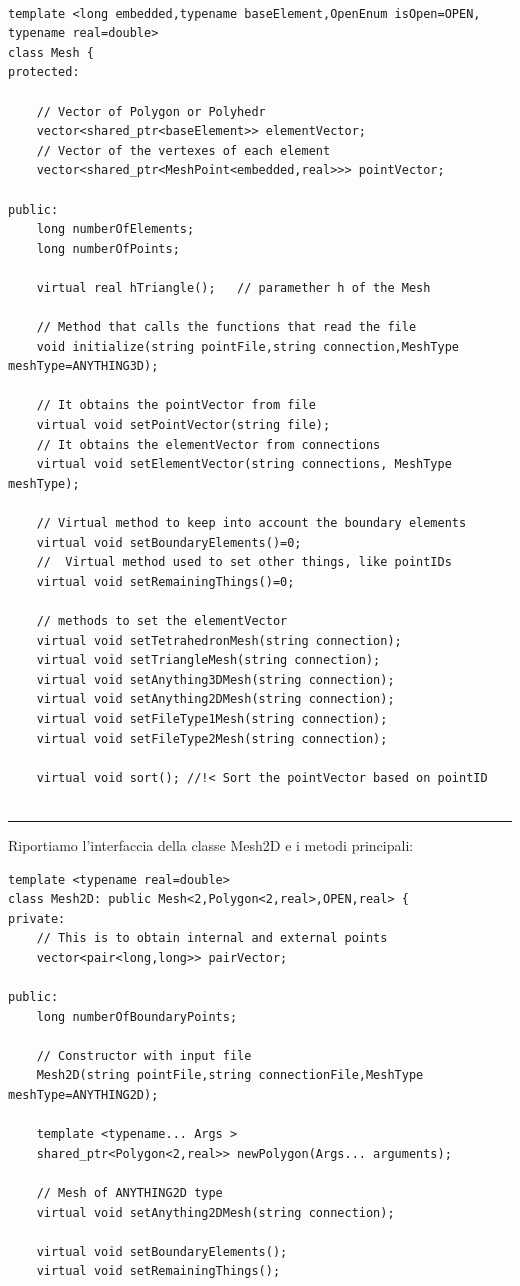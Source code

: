 \documentclass[oneside,12pt]{book}  %
\theoremstyle{plain}
\theoremstyle{definition}
\theoremstyle{remark}
\numberwithin{equation}{chapter} %
\begin{document}
\begin{verbatim}

template <long embedded,typename baseElement,OpenEnum isOpen=OPEN,
typename real=double>
class Mesh {
protected:
    
    // Vector of Polygon or Polyhedr
    vector<shared_ptr<baseElement>> elementVector;	
    // Vector of the vertexes of each element
    vector<shared_ptr<MeshPoint<embedded,real>>> pointVector;	
	
public:
    long numberOfElements;
    long numberOfPoints;

    virtual real hTriangle();	// paramether h of the Mesh
	
    // Method that calls the functions that read the file
    void initialize(string pointFile,string connection,MeshType meshType=ANYTHING3D);

    // It obtains the pointVector from file
    virtual void setPointVector(string file);	
    // It obtains the elementVector from connections
    virtual void setElementVector(string connections, MeshType meshType);
    
    // Virtual method to keep into account the boundary elements
    virtual void setBoundaryElements()=0;
    //	Virtual method used to set other things, like pointIDs
    virtual void setRemainingThings()=0;

    // methods to set the elementVector
    virtual void setTetrahedronMesh(string connection); 
    virtual void setTriangleMesh(string connection);	
    virtual void setAnything3DMesh(string connection);
    virtual void setAnything2DMesh(string connection);
    virtual void setFileType1Mesh(string connection);
    virtual void setFileType2Mesh(string connection);

    virtual void sort(); //!< Sort the pointVector based on pointID


\end{verbatim}

\noindent\rule{14cm}{1pt}

Riportiamo l'interfaccia della classe Mesh2D e i metodi principali:

\begin{verbatim}
template <typename real=double>
class Mesh2D: public Mesh<2,Polygon<2,real>,OPEN,real> {
private:
    // This is to obtain internal and external points	
    vector<pair<long,long>> pairVector;

public:
    long numberOfBoundaryPoints;
	
    // Constructor with input file
    Mesh2D(string pointFile,string connectionFile,MeshType meshType=ANYTHING2D);

    template <typename... Args >
    shared_ptr<Polygon<2,real>> newPolygon(Args... arguments);

    // Mesh of ANYTHING2D type
    virtual void setAnything2DMesh(string connection);

    virtual void setBoundaryElements();
    virtual void setRemainingThings();
\end{verbatim}
\end{document}
